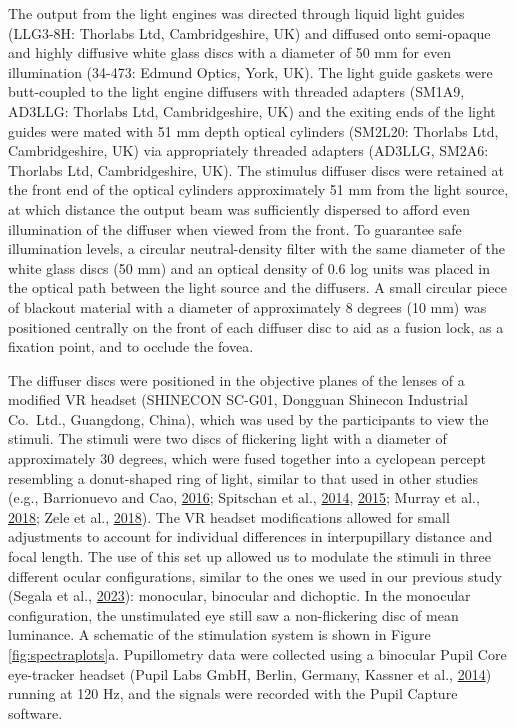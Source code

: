 \documentclass[
]{article}
\begin{document}
The output from the light engines was directed through liquid light guides (LLG3-8H: Thorlabs Ltd, Cambridgeshire, UK) and diffused onto semi-opaque and highly diffusive white glass discs with a diameter of 50 mm for even illumination (34-473: Edmund Optics, York, UK). The light guide gaskets were butt-coupled to the light engine diffusers with threaded adapters (SM1A9, AD3LLG: Thorlabs Ltd, Cambridgeshire, UK) and the exiting ends of the light guides were mated with 51 mm depth optical cylinders (SM2L20: Thorlabs Ltd, Cambridgeshire, UK) via appropriately threaded adapters (AD3LLG, SM2A6: Thorlabs Ltd, Cambridgeshire, UK). The stimulus diffuser discs were retained at the front end of the optical cylinders approximately 51 mm from the light source, at which distance the output beam was sufficiently dispersed to afford even illumination of the diffuser when viewed from the front. To guarantee safe illumination levels, a circular neutral-density filter with the same diameter of the white glass discs (50 mm) and an optical density of 0.6 log units was placed in the optical path between the light source and the diffusers. A small circular piece of blackout material with a diameter of approximately 8 degrees (10 mm) was positioned centrally on the front of each diffuser disc to aid as a fusion lock, as a fixation point, and to occlude the fovea.

The diffuser discs were positioned in the objective planes of the lenses of a modified VR headset (SHINECON SC-G01, Dongguan Shinecon Industrial Co.~Ltd., Guangdong, China), which was used by the participants to view the stimuli. The stimuli were two discs of flickering light with a diameter of approximately 30 degrees, which were fused together into a cyclopean percept resembling a donut-shaped ring of light, similar to that used in other studies (e.g., Barrionuevo and Cao, \protect\hyperlink{ref-Barrionuevo2016}{2016}; Spitschan et al., \protect\hyperlink{ref-Spitschan2014}{2014}, \protect\hyperlink{ref-Spitschan2015}{2015}; Murray et al., \protect\hyperlink{ref-Murray2018}{2018}; Zele et al., \protect\hyperlink{ref-Zele2018}{2018}). The VR headset modifications allowed for small adjustments to account for individual differences in interpupillary distance and focal length. The use of this set up allowed us to modulate the stimuli in three different ocular configurations, similar to the ones we used in our previous study (Segala et al., \protect\hyperlink{ref-Segala2023}{2023}): monocular, binocular and dichoptic. In the monocular configuration, the unstimulated eye still saw a non-flickering disc of mean luminance. A schematic of the stimulation system is shown in Figure \ref{fig:spectraplots}a. Pupillometry data were collected using a binocular Pupil Core eye-tracker headset (Pupil Labs GmbH, Berlin, Germany, Kassner et al., \protect\hyperlink{ref-Kassner2014}{2014}) running at 120 Hz, and the signals were recorded with the Pupil Capture software.
\end{document}
